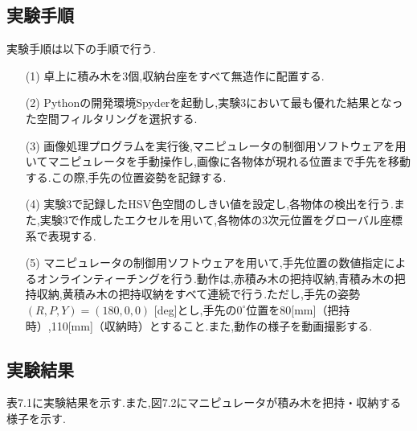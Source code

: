 \subsection{実験手順}
実験手順は以下の手順で行う.

\begin{enumerate}
  \item[(1)] 卓上に積み木を3個,収納台座をすべて無造作に配置する.
  \item[(2)] Pythonの開発環境Spyderを起動し,実験3において最も優れた結果となった空間フィルタリングを選択する.
  \item[(3)] 画像処理プログラムを実行後,マニピュレータの制御用ソフトウェアを用いてマニピュレータを手動操作し,画像に各物体が現れる位置まで手先を移動する.この際,手先の位置姿勢を記録する.
  \item[(4)] 実験3で記録したHSV色空間のしきい値を設定し,各物体の検出を行う.また,実験3で作成したエクセルを用いて,各物体の3次元位置をグローバル座標系で表現する.
  \item[(5)] マニピュレータの制御用ソフトウェアを用いて,手先位置の数値指定によるオンラインティーチングを行う.動作は,赤積み木の把持収納,青積み木の把持収納,黄積み木の把持収納をすべて連続で行う.ただし,手先の姿勢$(R, P, Y) = (180, 0, 0)$ [deg]とし,手先の$0^{\circ}$位置を80[mm]（把持時）,110[mm]（収納時）とすること.また,動作の様子を動画撮影する.
\end{enumerate}

\subsection{実験結果}
表7.1に実験結果を示す.また,図7.2にマニピュレータが積み木を把持・収納する様子を示す.

